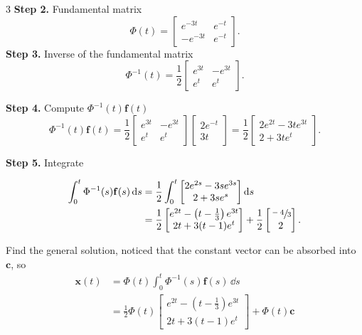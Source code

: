 \documentclass[10pt,landscape]{article}
\begin{document}
\begin{multicols}{3}
    \textbf{Step 2.} Fundamental matrix
    \[ \Phi(t) =
    \begin{bmatrix}
    e^{-3t} & e^{-t} \\
    - e^{-3t} & e^{-t}
    \end{bmatrix}.
    \]
    \textbf{Step 3.} Inverse of the fundamental matrix
    \[
    \Phi^{-1}(t) =
    \frac{1}{2}
    \begin{bmatrix}
    e^{3t} & -e^{3t} \\
    e^{t} & e^{t}
    \end{bmatrix}. \]

    \textbf{Step 4.} Compute $\Phi^{-1}(t)\mathbf{f}(t)$
    \[ \Phi^{-1}(t)\mathbf{f}(t) = \frac{1}{2}
    \begin{bmatrix}
    e^{3t} & -e^{3t} \\
    e^{t} & e^{t}
    \end{bmatrix}
    \begin{bmatrix}
    2e^{-t} \\
    3t
    \end{bmatrix}
    = \frac{1}{2}
    \begin{bmatrix}
    2e^{2t} - 3t e^{3t} \\
    2 + 3t e^{t}
    \end{bmatrix}. \]

    \textbf{Step 5.} Integrate

    \begin{align*}
    \int_0^t \Phi^{-1}(s)\mathbf{f}(s)\,\dd s
    &=
    \frac{1}{2}
    \int_0^t
    \begin{bmatrix}
    2e^{2s} - 3s e^{3s} \\
    2 + 3s e^{s}
    \end{bmatrix}
    \dd s\\
    &= \frac{1}{2}
    \begin{bmatrix}
    e^{2t} - \left(t - \frac{1}{3}\right)e^{3t} \\
    2t + 3(t-1)e^{t}
    \end{bmatrix}+\frac{1}{2}\begin{bmatrix}
        \sfrac{-4}{3}\\
        2
    \end{bmatrix}.
    \end{align*}

     Find the general solution, noticed that the constant vector can be absorbed into $\mathbf{c}$, so
    \begin{align*}
    \mathbf{x}(t)&= \Phi(t)
    \int_0^t \Phi^{-1}(s)\mathbf{f}(s)\,\dd s \\
    &=\frac{1}{2}\Phi(t)
    \begin{bmatrix}
    e^{2t} - \left(t - \frac{1}{3}\right)e^{3t} \\
    2t + 3(t-1)e^{t} 
    \end{bmatrix} +\Phi(t)\mathbf{c}
    \end{align*}


\end{multicols}
\end{document}
